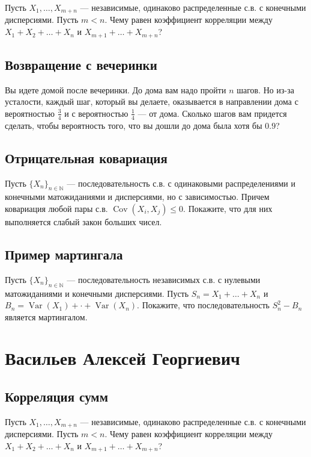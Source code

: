 \documentclass[12pt]{article}
\newcommand\N{\mathbb{N}}
\DeclareMathOperator{\Var}{Var}
\DeclareMathOperator{\Cov}{Cov}
\begin{document}
Пусть $X_1, \dots, X_{m + n}$ --- независимые, одинаково распределенные с.в. с конечными дисперсиями. Пусть $m < n$. Чему равен коэффициент корреляции между $X_1 + X_2 + \dots + X_n$ и $X_{m + 1} + \dots + X_{m + n}$?

\subsection{Возвращение с вечеринки}

Вы идете домой после вечеринки. До дома вам надо пройти $n$ шагов. Но из-за усталости, каждый шаг, который вы делаете, оказывается в направлении дома с вероятностью $\frac{3}{4}$ и с вероятностью $\frac{1}{4}$ --- от дома. Сколько шагов вам придется сделать, чтобы вероятность того, что вы дошли до дома была хотя бы $0.9$?

\subsection{Отрицательная ковариация}

Пусть $\{X_n\}_{n \in \N}$ --- последовательность с.в. с одинаковыми распределениями и конечными матожиданиями и дисперсиями, но с зависимостью. Причем ковариация любой пары с.в. $\Cov(X_i, X_j) \le 0$. Покажите, что для них выполняется слабый закон больших чисел.


\subsection{Пример мартингала}

Пусть $\{X_n\}_{n \in \N}$ --- последовательность независимых с.в. с нулевыми матожиданиями и конечными дисперсиями. Пусть $S_n = X_1 + \dots + X_n$ и $B_n = \Var(X_1) + \cdot + \Var(X_n)$. Покажите, что последовательность $S_n^2 - B_n$ является мартингалом.


\newpage
\section{Васильев Алексей Георгиевич}

\subsection{Корреляция сумм}

Пусть $X_1, \dots, X_{m + n}$ --- независимые, одинаково распределенные с.в. с конечными дисперсиями. Пусть $m < n$. Чему равен коэффициент корреляции между $X_1 + X_2 + \dots + X_n$ и $X_{m + 1} + \dots + X_{m + n}$?
\end{document}
